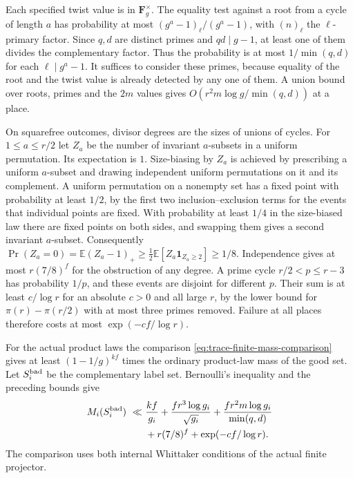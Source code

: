 Each specified twist value is in \(\mathbf F_g^\times\). The equality
test against a root from a cycle of length \(a\) has probability
at most \((g^a-1)_\ell/(g^a-1)\), with \((n)_\ell\) the
\(\ell\)-primary factor. Since \(q,d\) are distinct primes and
\(qd\mid g-1\), at least one of them divides the complementary factor.
Thus the probability is at most \(1/\min(q,d)\) for each
\(\ell\mid g^a-1\). It suffices to consider these primes, because
equality of the root and the twist value is already detected by any
one of them. A union bound over roots, primes and the \(2m\) values
gives \(O(r^2m\log g/\min(q,d))\) at a place.

On squarefree outcomes, divisor degrees are the sizes of unions
of cycles. For \(1\le a\le r/2\) let \(Z_a\) be the number of invariant
\(a\)-subsets in a uniform permutation. Its expectation is \(1\).
Size-biasing by \(Z_a\) is achieved by prescribing a uniform \(a\)-subset
and drawing independent uniform permutations on it and its complement.
A uniform permutation on a nonempty set has a fixed point with
probability at least \(1/2\), by the first two inclusion--exclusion
terms for the events that individual points are fixed. With probability
at least \(1/4\) in the size-biased law there are fixed points on both
sides, and swapping them gives a second invariant \(a\)-subset.
Consequently \(\Pr(Z_a=0)=\mathbb E (Z_a-1)_+\ge
\tfrac12\mathbb E[Z_a\mathbf 1_{Z_a\ge2}]\ge1/8\).
Independence gives at most \(r(7/8)^f\) for the obstruction of any degree.
A prime cycle \(r/2<p\le r-3\) has probability \(1/p\),
and these events are disjoint for different \(p\).
Their sum is at least \(c/\log r\) for an absolute \(c>0\) and all
large \(r\), by the lower bound for \(\pi(r)-\pi(r/2)\) with at
most three primes removed.
\cite[Corollary~3, (3.8), p.~69]{rosser-schoenfeld}
Failure at all places therefore costs at most \(\exp(-cf/\log r)\).

For the actual product laws the comparison
\eqref{eq:trace-finite-mass-comparison} gives at least
\((1-1/g)^{kf}\) times the ordinary product-law mass of the good set.
Let \(S_i^{\rm bad}\) be the complementary label set. Bernoulli's
inequality and the preceding bounds give
\begin{equation}
\label{eq:trace-bad-mass}
 \begin{split}
 M_i(S_i^{\rm bad})\ \ll\
 &\frac{kf}{g_i}
 +\frac{fr^3\log g_i}{\sqrt{g_i}}
 +\frac{fr^2m\log g_i}{\min(q,d)}\\
 &+r(7/8)^f+\exp(-cf/\log r).
 \end{split}
\end{equation}
The comparison uses both internal Whittaker conditions of the
actual finite projector.

